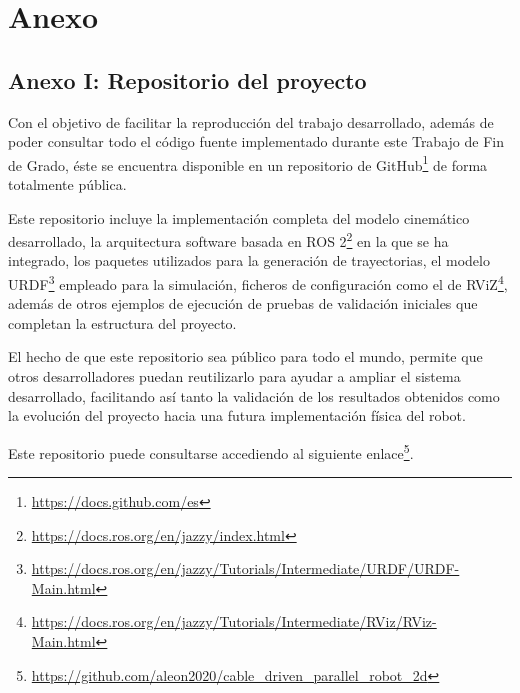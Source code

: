 \chapter*{Anexo}
\label{cap:capitulo8}

\section*{Anexo I: Repositorio del proyecto}

Con el objetivo de facilitar la reproducción del trabajo desarrollado, además de poder consultar todo el código fuente implementado durante este Trabajo de Fin de Grado, éste se encuentra disponible en un repositorio de GitHub\footnote{\url{https://docs.github.com/es}} de forma totalmente pública.

\vspace{0.25cm}

Este repositorio incluye la implementación completa del modelo cinemático desarrollado, la arquitectura software basada en ROS 2\footnote{\url{https://docs.ros.org/en/jazzy/index.html}} en la que se ha integrado, los paquetes utilizados para la generación de trayectorias, el modelo URDF\footnote{\url{https://docs.ros.org/en/jazzy/Tutorials/Intermediate/URDF/URDF-Main.html}} empleado para la simulación, ficheros de configuración como el de RViZ\footnote{\url{https://docs.ros.org/en/jazzy/Tutorials/Intermediate/RViz/RViz-Main.html}}, además de otros ejemplos de ejecución de pruebas de validación iniciales que completan la estructura del proyecto.

\vspace{0.25cm}

El hecho de que este repositorio sea público para todo el mundo, permite que otros desarrolladores puedan reutilizarlo para ayudar a ampliar el sistema desarrollado, facilitando así tanto la validación de los resultados obtenidos como la evolución del proyecto hacia una futura implementación física del robot.

\vspace{0.25cm}

Este repositorio puede consultarse accediendo al siguiente enlace\footnote{\url{https://github.com/aleon2020/cable\_driven\_parallel\_robot\_2d}}.
